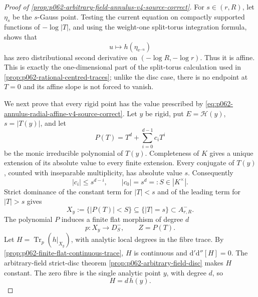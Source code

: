 
\begin{proof}[Proof of \cref{prop:p062-arbitrary-field-annulus-v4-source-correct}]
For \(s\in(r,R)\), let \(\eta_s\) be the \(s\)-Gauss point. Testing the
current equation on compactly supported functions of
\(-\log|T|\), and using the weight-one split-torus integration formula,
shows that
\begin{equation}\label{eq:p062-annulus-radial-affine-v4-source-correct}
             u\longmapsto h(\eta_{\mathrm e^{-u}})
\end{equation}
has zero distributional second derivative on
\((-\log R,-\log r)\). Thus it is affine. This is exactly the
one-dimensional part of the split-torus calculation used in
\cref{prop:p062-rational-centred-traces}; unlike the disc case, there is
no endpoint at \(T=0\) and its affine slope is not forced to vanish.

We next prove that every rigid point has the value prescribed by
\eqref{eq:p062-annulus-radial-affine-v4-source-correct}. Let \(y\) be rigid, put
\(E=\mathscr H(y)\), \(s=|T(y)|\), and let
\[
                 P(T)=T^d+\sum_{i=0}^{d-1}c_iT^i
\]
be the monic irreducible polynomial of \(T(y)\). Completeness of \(K\)
gives a unique extension of its absolute value to every finite extension.
Every conjugate of \(T(y)\), counted with inseparable multiplicity, has
absolute value \(s\). Consequently
\begin{equation}\label{eq:p062-annulus-coefficient-bounds-v4-source-correct}
             |c_i|\leq s^{d-i},
             \qquad |c_0|=s^d=:S\in|K^\times|.
\end{equation}
Strict dominance of the constant term for \(|T|<s\) and of the leading
term for \(|T|>s\) gives
\begin{equation}\label{eq:p062-annulus-polynomial-tube-v4-source-correct}
 X_y:=\{|P(T)|<S\}\subseteq\{|T|=s\}\subset A^-_{r,R}.
\end{equation}
The polynomial \(P\) induces a finite flat morphism of degree \(d\)
\[
             p\colon X_y\longrightarrow D^-_S,
             \qquad Z=P(T).
\]
Let \(H=\operatorname{Tr}_p(h|_{X_y})\), with analytic local degrees in
the fibre trace. By \cref{prop:p062-finite-flat-continuous-trace}, \(H\)
is continuous and \(\mathrm d'\mathrm d''[H]=0\). The arbitrary-field
strict-disc theorem \cref{prop:p062-arbitrary-field-disc} makes \(H\)
constant. The zero fibre is the single analytic point \(y\), with degree
\(d\), so
\begin{equation}\label{eq:p062-annulus-trace-zero-v4-source-correct}
                              H=d\,h(y).
\end{equation}


\end{proof}
